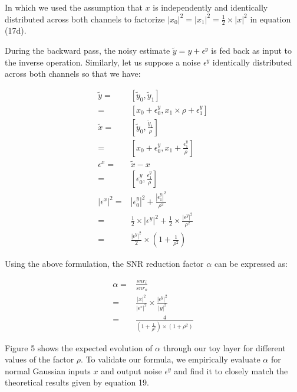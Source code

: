 \documentclass[twocolumn]{bmcart}
\begin{document}
In which we used the assumption that $x$ is independently and identically distributed across both channels
to factorize $|x_0|^2 = |x_1|^2 = \frac{1}{2} \times |x|^2$ in equation (17d).

During the backward pass, the noisy estimate $\tilde{y}=y+\epsilon^y$ is fed back as input to the inverse operation.
Similarly, let us suppose a noise $\epsilon^y$ identically distributed across both channels so that we have:

\begin{subequations}
\begin{align}
\tilde{y}       =& [ \tilde{y}_0, \tilde{y}_1 ] \\
                =& [ x_0 + \epsilon_0^y, x_1 \times \rho + \epsilon_1^y ] \\
\tilde{x}       =& [ \tilde{y}_0, \frac{\tilde{y}_1}{\rho}] \\
                =& [ x_0 + \epsilon_{0}^y, x_1 + \frac{\epsilon_{1}^y}{\rho} ]\\
\epsilon^x      =& \tilde{x} - x\\
                =& [ \epsilon_0^y, \frac{\epsilon_{1}^y}{\rho} ]\\
|\epsilon^x|^2  =& |\epsilon_0^y|^2 + \frac{|\epsilon_1^y|^2}{\rho^2} \\
                =& \frac{1}{2} \times |\epsilon^y|^2 + \frac{1}{2} \times \frac{|\epsilon^y|^2}{\rho^2} \\
                =& \frac{|\epsilon^y|^2}{2} \times (1 + \frac{1}{\rho^2})
\end{align}
\end{subequations}

Using the above formulation, the SNR reduction factor $\alpha$ can be expressed as:

\begin{subequations}
\begin{align}
\alpha =& \frac{snr_i}{snr_o} \\
 =& \frac{|x|^2}{|\epsilon^x|^2} \times  \frac{|\epsilon^y|^2}{|y|^2} \\
 =& \frac{4}{(1+\frac{1}{\rho^2}) \times (1 + \rho^2)}
\end{align}
\end{subequations}

Figure 5 shows the expected evolution of $\alpha$ through our toy layer for different values of the factor $\rho$.
To validate our formula, we empirically evaluate $\alpha$ for normal Gaussian inputs $x$ and output noise $\epsilon^y$ and find it to closely match the theoretical results given by equation 19.
\end{document}
